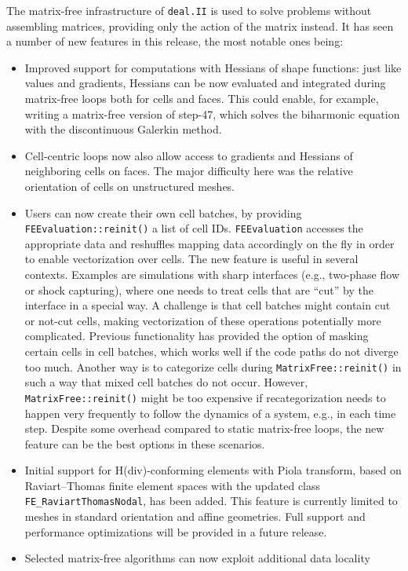 \documentclass{ansarticle-preprint}
\newcommand{\specialword}[1]{\texttt{#1}}
\newcommand{\dealii}{{\specialword{deal.II}}\xspace}
\begin{document}
The matrix-free infrastructure of \dealii{} is used to solve problems
without assembling matrices, providing only the action of the matrix
instead. It has seen a number of new features in this release, the most
notable ones being:
\begin{itemize}
\item Improved support for computations with Hessians of shape functions: just like values and gradients, Hessians can be
now evaluated and integrated during matrix-free loops
both for cells and faces. This could enable, for example, writing
a matrix-free version of step-47, which solves the biharmonic equation with the discontinuous Galerkin method.
\item Cell-centric loops now also allow access to gradients and Hessians
of neighboring cells on faces. The major difficulty here was the relative orientation
of cells on unstructured meshes.
\item Users can now create their own cell batches, by providing \texttt{FEEvaluation::reinit()} a list of cell IDs. \texttt{FEEvaluation}
accesses the appropriate data and reshuffles mapping data accordingly on
the fly in order to enable vectorization over cells. The new feature is useful in several
contexts. Examples are simulations with sharp interfaces (e.g., two-phase flow
or shock capturing), where one needs to treat cells that are ``cut'' by
the interface in a special way. A challenge is that cell batches
might contain cut or not-cut cells, making vectorization of these operations potentially more complicated. Previous functionality has provided the option of masking certain cells in cell batches, which works well if
the code paths do not diverge too much. Another way is to
categorize cells during \texttt{MatrixFree::reinit()} in such a way that mixed cell batches do not occur. However, \texttt{MatrixFree::reinit()}
might be too expensive if recategorization needs to happen very frequently to follow the dynamics of a system, e.g., in each time step. Despite some overhead compared to static matrix-free loops, the new feature can be the best options in these scenarios.
\item Initial support for H(div)-conforming elements with Piola transform, based on Raviart--Thomas finite element spaces with the updated class \texttt{FE\_RaviartThomasNodal}, has been added. This feature is currently limited to meshes in standard orientation and affine geometries. Full support and performance optimizations will be provided in a future release.
\item Selected matrix-free algorithms can now exploit additional data locality

\end{itemize}
\end{document}

